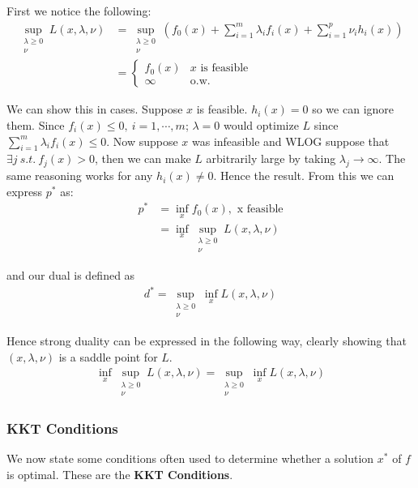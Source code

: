 \documentclass[]{article}
\theoremstyle{mattstyle}
\theoremstyle{definition}
\begin{document}
First we notice the following:
\begin{align*}
\sup\limits_{\substack{\lambda\ge0 \\ \nu}} L(x, \lambda, \nu) &= \sup\limits_{\substack{\lambda\ge0 \\ \nu}} \left( f_0(x) + \sum_{i=1}^m \lambda_if_i(x) + \sum_{i=1}^p \nu_i h_i(x) \right)\\
&= \begin{cases}
f_0(x) & \text{$x$ is feasible}\\
\infty & \text{o.w.}
\end{cases}
\end{align*}

We can show this in cases. Suppose $x$ is feasible. $h_i(x)=0$ so we can ignore them. Since $f_i(x) \le 0,\ i=1, \cdots, m$; $\lambda = 0$ would optimize $L$ since $\sum_{i=1}^m \lambda_if_i(x) \le 0$. Now suppose $x$ was infeasible and WLOG suppose that $ \exists j \ s.t.\ f_j(x) > 0$, then we can make $L$ arbitrarily large by taking $\lambda_j \rightarrow \infty$. The same reasoning works for any $h_i(x) \ne 0$. Hence the result. From this we can express $p^*$ as:
\begin{align*}
p^* &= \inf_x f_0(x), \text{  x feasible}\\
&= \inf_x\sup_{\substack{\lambda\ge0 \\ \nu}}L(x, \lambda, \nu)
\end{align*}

and our dual is defined as
\begin{align*}
d^* = \sup_{\substack{\lambda\ge0 \\ \nu}}\inf_x L(x, \lambda, \nu)
\end{align*}

Hence strong duality can be expressed in the following way, clearly showing that $(x, \lambda, \nu)$ is a saddle point for $L$.
\begin{align*}
\inf_x\sup_{\substack{\lambda\ge0 \\ \nu}}L(x, \lambda, \nu) = \sup_{\substack{\lambda\ge0 \\ \nu}}\inf_x L(x, \lambda, \nu)
\end{align*}

\newpage

\subsubsection{KKT Conditions}

We now state some conditions often used to determine whether a solution $x^*$ of $f$ is optimal. These are the \textbf{KKT Conditions}.
\end{document}
